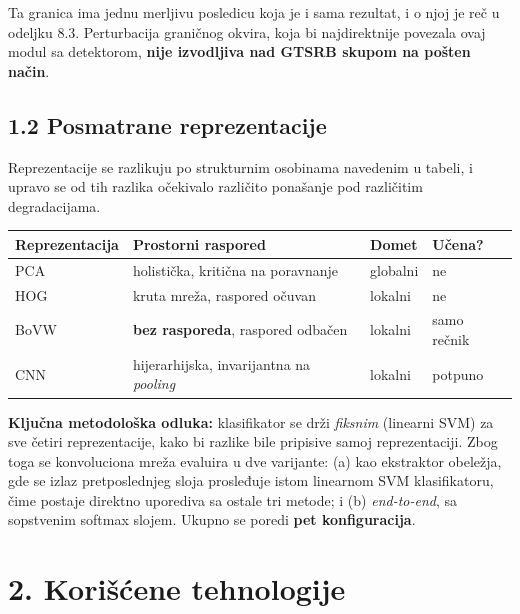 \documentclass[11pt,a4paper]{article}
\begin{document}
Ta granica ima jednu merljivu posledicu koja je i sama rezultat, i o njoj je reč u odeljku
8.3. Perturbacija graničnog okvira, koja bi najdirektnije povezala ovaj modul sa detektorom,
\textbf{nije izvodljiva nad GTSRB skupom na pošten način}.

\subsection*{1.2 Posmatrane reprezentacije}

Reprezentacije se razlikuju po strukturnim osobinama navedenim u tabeli, i upravo se od tih
razlika očekivalo različito ponašanje pod različitim degradacijama.

\begin{center}
\begin{tabular}{|>{\raggedright\arraybackslash}p{3.0cm}|>{\raggedright\arraybackslash}p{5.2cm}|>{\raggedright\arraybackslash}p{2.2cm}|>{\raggedright\arraybackslash}p{2.6cm}|}
\hline
\textbf{Reprezentacija} & \textbf{Prostorni raspored} & \textbf{Domet} & \textbf{Učena?} \\
\hline
PCA & holistička, kritična na poravnanje & globalni & ne \\
\hline
HOG & kruta mreža, raspored očuvan & lokalni & ne \\
\hline
BoVW & \textbf{bez rasporeda}, raspored odbačen & lokalni & samo rečnik \\
\hline
CNN & hijerarhijska, invarijantna na \textit{pooling} & lokalni & potpuno \\
\hline
\end{tabular}
\end{center}

\textbf{Ključna metodološka odluka:} klasifikator se drži \emph{fiksnim} (linearni SVM) za sve
četiri reprezentacije, kako bi razlike bile pripisive samoj reprezentaciji. Zbog
toga se konvoluciona mreža evaluira u dve varijante: (a) kao ekstraktor obeležja, gde se izlaz
pretposlednjeg sloja prosleđuje istom linearnom SVM klasifikatoru, čime postaje direktno
uporediva sa ostale tri metode; i (b) \textit{end-to-end}, sa sopstvenim softmax slojem.
Ukupno se poredi \textbf{pet konfiguracija}.


\newpage

\section*{2. Korišćene tehnologije}
\end{document}
